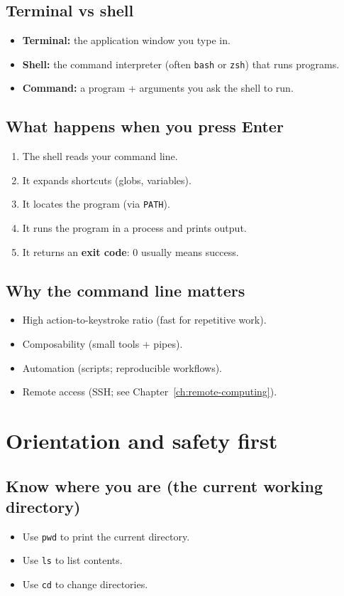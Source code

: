 \subsection{Terminal vs shell}
\begin{itemize}
\item \textbf{Terminal:} the application window you type in.
\item \textbf{Shell:} the command interpreter (often \texttt{bash} or \texttt{zsh}) that runs programs.
\item \textbf{Command:} a program + arguments you ask the shell to run.
\end{itemize}

\subsection{What happens when you press Enter}
\begin{enumerate}
\item The shell reads your command line.
\item It expands shortcuts (globs, variables).
\item It locates the program (via \texttt{PATH}).
\item It runs the program in a process and prints output.
\item It returns an \textbf{exit code}: 0 usually means success.
\end{enumerate}

\subsection{Why the command line matters}
\begin{itemize}
\item High action-to-keystroke ratio (fast for repetitive work).
\item Composability (small tools + pipes).
\item Automation (scripts; reproducible workflows).
\item Remote access (SSH; see Chapter~\ref{ch:remote-computing}).
\end{itemize}

\section{Orientation and safety first}
\subsection{Know where you are (the current working directory)}
\begin{itemize}
\item Use \texttt{pwd} to print the current directory.
\item Use \texttt{ls} to list contents.
\item Use \texttt{cd} to change directories.
\end{itemize}

